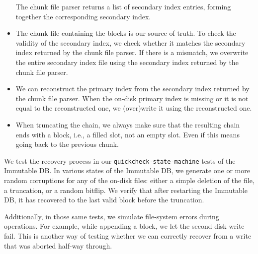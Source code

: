 \begin{itemize}
  The chunk file parser returns a list of secondary index entries, forming
  together the corresponding secondary index.

\item The chunk file containing the blocks is our source of truth. To check the
  validity of the secondary index, we check whether it matches the secondary
  index returned by the chunk file parser. If there is a mismatch, we overwrite
  the entire secondary index file using the secondary index returned by the
  chunk file parser.

\item We can reconstruct the primary index from the secondary index returned by
  the chunk file parser. When the on-disk primary index is missing or it is not
  equal to the reconstructed one, we (over)write it using the reconstructed one.

\item When truncating the chain, we always make sure that the resulting chain
  ends with a block, i.e., a filled slot, not an empty slot. Even if this means
  going back to the previous chunk.

\end{itemize}

We test the recovery process in our \lstinline!quickcheck-state-machine! tests
of the Immutable DB. In various states of the Immutable DB, we generate one or
more random corruptions for any of the on-disk files: either a simple deletion
of the file, a truncation, or a random bitflip. We verify that after restarting
the Immutable DB, it has recovered to the last valid block before the
truncation.

Additionally, in those same tests, we simulate file-system errors during
operations. For example, while appending a block, we let the second disk write
fail. This is another way of testing whether we can correctly recover from a
write that was aborted half-way through.
